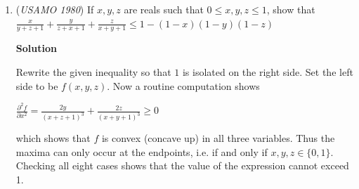 \begin{enumerate}
	\item (\textit{USAMO 1980}) If $x, y, z$ are reals such that $0\le x, y, z \le 1$, show that $\frac{x}{y + z + 1} + \frac{y}{z + x + 1} + \frac{z}{x + y +  1} \le 1 - (1 - x)(1 - y)(1 - z)$




\textbf{Solution}

Rewrite the given inequality so that $1$ is isolated on the right side. Set the left side to be $f(x, y, z)$. Now a routine computation shows

 
$\frac{\partial^2 f}{\partial x^2} = \frac{2y}{(x + z + 1)^3} + \frac{2z}{(x + y + 1)^3}\geq 0$

 
which shows that $f$ is convex (concave up) in all three variables. Thus the maxima can only occur at the endpoints, i.e. if and only if $x, y, z \in \{0,1\}$. Checking all eight cases shows that the value of the expression cannot exceed 1.

 


\end{enumerate}